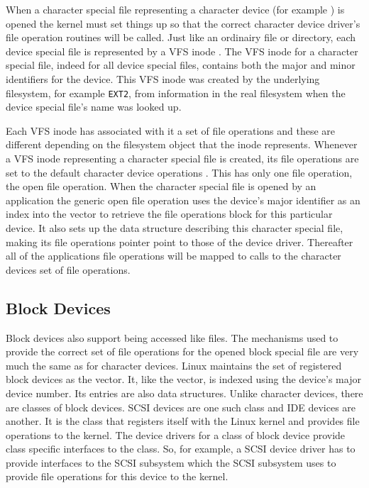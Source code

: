 When a character special file representing a character device (for example
) is opened the kernel must set things up so that the correct
character device driver's file operation routines will be called.
Just like an ordinairy file or directory, each device special file is 
represented by a VFS inode .
The VFS inode for a character special file, indeed for all device special
files, contains both the major and minor identifiers for the device.
This VFS inode was created by the underlying filesystem, for example
\texttt{EXT2}, from information in the real filesystem when the device 
special file's name was looked up.

Each VFS inode has associated with it a set of file operations and these are 
different depending on the filesystem object that the inode represents.
Whenever a VFS inode representing a character special file is created,
its file operations are set to the default character device operations
.
This has only one file operation, the open file operation.
When the character special file is opened by an application the generic
open file operation  uses the
device's major identifier as an index into the 
 vector to retrieve the file
operations block for this particular device.
It also sets up the  data structure describing this character
special file, making its file operations pointer point to those of the
device driver.
Thereafter all of the applications file operations will be mapped to 
calls to the character devices set of file operations.

\subsection{Block Devices}
Block devices also support being accessed like files.
The mechanisms used to provide the correct set of file operations for
the opened block special file are very much the same as for character
devices.
Linux maintains the set of registered block devices as the 
  vector.
It, like the  vector, is indexed
using the device's major device number.
Its entries are also  data structures.
Unlike character devices, there are classes of block devices.
SCSI devices are one such class and IDE devices are another.
It is the class that registers itself with the Linux kernel and provides
file operations to the kernel.
The device drivers for a class of block device provide class specific 
interfaces to the class.
So, for example, a SCSI device driver has to provide interfaces to the
SCSI subsystem which the SCSI subsystem uses to provide file operations
for this device to the kernel.

